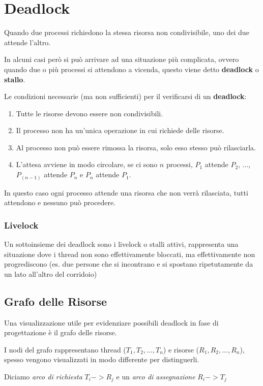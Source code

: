\section{Deadlock}
Quando due processi richiedono la stessa risorsa non condivisibile, uno dei due attende l'altro.

\spacer
In alcuni casi però si può arrivare ad una situazione più complicata, ovvero quando due o più processi si attendono a vicenda, questo viene detto \textbf{deadlock} o \textbf{stallo}.

\spacer
Le condizioni necessarie (ma non sufficienti) per il verificarsi di un \textbf{deadlock}:
\begin{enumerate}
    \item Tutte le risorse devono essere non condivisibili.
    \item Il processo non ha un'unica operazione in cui richiede delle risorse.
    \item Al processo non può essere rimossa la risorsa, solo esso stesso può rilasciarla.
    \item L'attesa avviene in modo circolare, se ci sono $n$ processi, $P_1$ attende $P_2$, $\ldots$, $P_(n-1)$ attende $P_n$ e $P_n$ attende $P_1$.
\end{enumerate}

In questo caso ogni processo attende una risorsa che non verrà rilasciata, tutti attendono e nessuno può procedere.

\subsubsection*{Livelock}
Un sottoinsieme dei deadlock sono i livelock o stalli attivi, rappresenta una situazione dove i thread non sono effettivamente bloccati, ma effettivamente non progrediscono (es. due persone che si incontrano e si spostano ripetutamente da un lato all'altro del corridoio)

\subsection{Grafo delle Risorse}
Una visualizzazione utile per evidenziare possibili deadlock in fase di progettazione è il grafo delle risorse.

\spacer
I nodi del grafo rappresentano thread ($T_1, T_2, \ldots, T_n$) e risorse ($R_1, R_2, \ldots, R_n$), spesso vengono visualizzati in modo differente per distinguerli.

Diciamo \textit{arco di richiesta} $T_i -> R_j$ e un \textit{arco di assegnazione} $R_i -> T_j$


